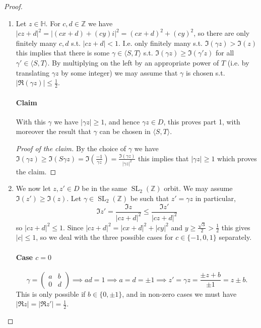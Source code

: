\documentclass{article}
\theoremstyle{definition}
\DeclareMathOperator{\SL}{SL}
\begin{document}
\begin{proof}
\begin{enumerate}
\item Let $z \in \mathbb{H}$.
For $c,d\in \mathbb{Z}$ we have $|cz+d|^2 = |(cx+d) + (cy)i|^2 = (cx+d)^2 + (cy)^2$, so there are only finitely many $c,d$ s.t. $|cz+d|< 1$.
I.e. only finitely many s.t. $\Im(\gamma z) > \Im(z)$ this implies that there is some $\gamma \in \langle S,T\rangle$ s.t. $\Im(\gamma z) \ge \Im(\gamma'z)$ for all $\gamma' \in \langle S,T\rangle$.
By multiplying on the left by an appropriate power of $T$ (i.e. by translating $\gamma z$ by some integer) we may assume that $\gamma$ is chosen s.t. $|\Re(\gamma z)| \le \frac 1 2$.

\paragraph{Claim}
With this $\gamma$ we have $|\gamma z| \ge 1$, and hence $\gamma z \in D$, this proves part 1, with moreover the result that $\gamma$ can be chosen in $\langle S,T\rangle$.
\begin{proof}[Proof of the claim]
By the choice of $\gamma$ we have $\Im(\gamma z) \ge \Im(S\gamma z) = \Im(\frac{-1}{\gamma z}) = \frac{\Im(\gamma z)}{|\gamma z|^2}$ this implies that $|\gamma z| \ge 1$ which proves the claim.
\end{proof}

\item We now let $z,z'\in D$ be in the same $\SL_2(\mathbb{Z})$ orbit.
We may assume $\Im(z') \ge \Im(z)$.
Let $\gamma \in \SL_2(\mathbb{Z})$ be such that $z' = \gamma z$ in particular, 
\[ \Im z' = \frac{\Im z}{|cz+d|^2} \le \frac{\Im z'}{|cz+d|^2}\]
so $|cz+d|^2 \le 1$.
Since $|cz+d|^2 = |cx+d|^2 + |cy|^2$ and $y \ge \frac{\sqrt{3}}{2} > \frac{1}{2}$ this gives $|c| \le 1$, so we deal with the three possible cases for $c\in\{-1,0,1\}$ separately.

\paragraph{Case $c=0$}
\[\gamma =\begin{pmatrix}a&b\\0&d
\end{pmatrix} \implies ad= 1\implies a=d=\pm1\implies z' = \gamma z = \frac{\pm z + b}{\pm 1} = z \pm b.\]
This is only possible if $b\in\{0,\pm 1\}$, and in non-zero cases we must have $|\Re z | = |\Re z'| = \frac 1 2$.


\end{enumerate}
\end{proof}
\end{document}
